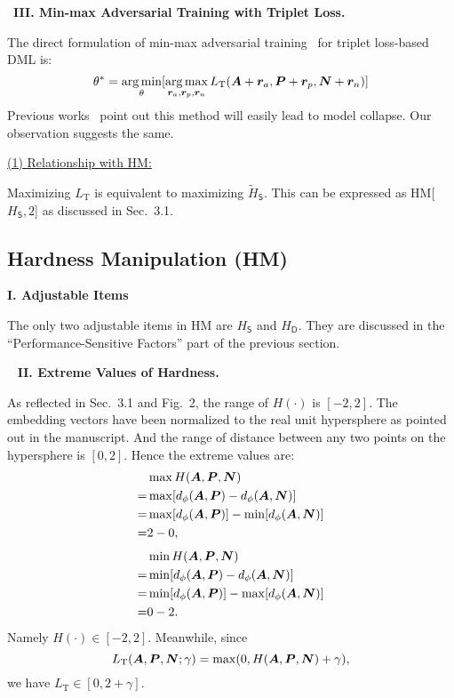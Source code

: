 ~\newline\textbf{III. Min-max Adversarial Training with Triplet Loss.}

The direct formulation of min-max adversarial training~\cite{madry} for
triplet loss-based DML is:
%
\begin{equation}
%
	\theta^* = \argmin_\theta [ \argmax_{\vr_a, \vr_p, \vr_n} L_\text{T}(
	\mA + \vr_a, \mP + \vr_p, \mN + \vr_n)]
%
\end{equation}
%
Previous works~\cite{advrank,robrank} point out this method will easily lead
to model collapse.
%
Our observation suggests the same.

\ul{(1) Relationship with HM:}

Maximizing $L_\text{T}$ is equivalent to maximizing $\tilde{H}_\mathsf{S}$.
%
This can be expressed as HM[$H_\mathsf{S},2$] as discussed in Sec.~3.1.

\subsection{Hardness Manipulation (HM)}
\label{sec:b2}

\noindent\textbf{I. Adjustable Items}

The only two adjustable items in HM are $H_\mathsf{S}$ and $H_\mathsf{D}$.
%
They are discussed in the ``Performance-Sensitive Factors'' part of the
previous section.


~\newline
\noindent\textbf{II. Extreme Values of Hardness.}

As reflected in Sec.~3.1 and Fig.~2, the range of $H(\cdot)$ is $[-2, 2]$.
%
The embedding vectors have been normalized to the real unit hypersphere
as pointed out in the manuscript.
%
And the range of distance between any two points on the hypersphere is
$[0,2]$.
%
Hence the extreme values are:
%
\begin{align}
	& \max H({\bm{A}}, {\bm{P}}, {\bm{N}})\\
	=& \max [d_\phi({\bm{A}}, {\bm{P}}) - d_\phi({\bm{A}}, {\bm{N}})]\\
	=& \max [d_\phi({\bm{A}}, {\bm{P}})] - \min [d_\phi({\bm{A}}, {\bm{N}})]\\
	=& 2 - 0,
\end{align}
%
\begin{align}
	& \min H({\bm{A}}, {\bm{P}}, {\bm{N}})\\
	=& \min [d_\phi({\bm{A}}, {\bm{P}}) - d_\phi({\bm{A}}, {\bm{N}})]\\
	=& \min [d_\phi({\bm{A}}, {\bm{P}})] - \max [d_\phi({\bm{A}}, {\bm{N}})]\\
	=& 0 - 2.
\end{align}
%
Namely $H(\cdot)\in[-2,2]$. Meanwhile, since
%
\begin{equation}
%
L_\text{T}(\mA, \mP, \mN; \gamma) = \max(0, H(\mA, \mP, \mN) + \gamma),
%
\end{equation}
%
we have $L_\text{T}\in[0, 2+\gamma]$.

